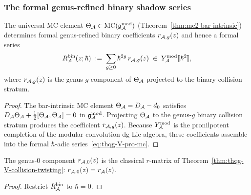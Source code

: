 \subsubsection{The formal genus-refined binary shadow series}

\begin{theorem}
\label{thm:thqg-V-pro-mc-element}
The universal MC element $\Theta_{\mathcal{A}} \in \mathrm{MC}(\mathfrak{g}_{\mathcal{A}}^{\mathrm{mod}})$
\textup{(}Theorem~\textup{\ref{thm:mc2-bar-intrinsic})}
determines formal genus-refined binary coefficients
$r_{\mathcal{A},g}(z)$ and hence a formal series
\begin{equation}\label{eq:thqg-V-pro-mc}
R^{\mathrm{bin}}_{\mathcal{A}}(z;\hbar)
\;:=\;
\sum_{g \geq 0}
\hbar^{2g}\,r_{\mathcal{A},g}(z)
\;\in\;
Y^{\mathrm{mod}}_{\mathcal{A}}[\![\hbar^2]\!],
\end{equation}
where $r_{\mathcal{A},g}(z)$ is the genus-$g$ component of
$\Theta_{\mathcal{A}}$ projected to the binary collision stratum.
\end{theorem}

\begin{proof}
The bar-intrinsic MC element $\Theta_{\mathcal{A}} = D_{\mathcal{A}} - d_0$
satisfies $D_{\mathcal{A}}\Theta_{\mathcal{A}} + \tfrac{1}{2}[\Theta_{\mathcal{A}},\Theta_{\mathcal{A}}] = 0$
in $\mathfrak{g}_{\mathcal{A}}^{\mathrm{mod}}$. Projecting $\Theta_{\mathcal{A}}$ to the genus-$g$ binary
collision stratum produces the coefficient $r_{\mathcal{A},g}(z)$.
Because $Y^{\mathrm{mod}}_{\mathcal{A}}$ is the pronilpotent completion of the modular
convolution dg Lie algebra, these coefficients assemble into the
formal $\hbar$-adic series~\eqref{eq:thqg-V-pro-mc}.
\end{proof}

\begin{corollary}[Genus-$0$ component = classical $r$-matrix;
\ClaimStatusProvedHere]
\label{cor:thqg-V-genus-zero-r}
The genus-$0$ component $r_{\mathcal{A},0}(z)$ is the classical $r$-matrix
of Theorem~\ref{thm:thqg-V-collision-twisting}:
$r_{\mathcal{A},0}(z) = r_{\mathcal{A}}(z)$.
\end{corollary}

\begin{proof}
Restrict $R^{\mathrm{bin}}_{\mathcal{A}}$ to $\hbar = 0$.
\end{proof}

